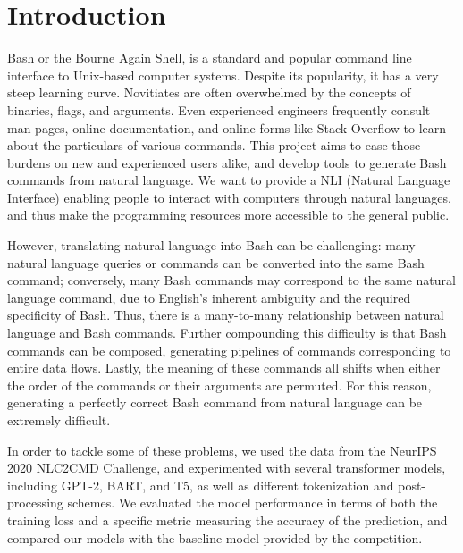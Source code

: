 \section{Introduction}
Bash or the Bourne Again Shell, is a standard and popular command line
interface to Unix-based computer systems. Despite its popularity, it has a
very steep learning curve. Novitiates are often overwhelmed by the concepts of
binaries, flags, and arguments. Even experienced engineers frequently consult
man-pages, online documentation, and online forms like Stack Overflow to learn
about the particulars of various commands. This project aims to ease those
burdens on new and experienced users alike, and develop tools to generate Bash
commands from natural language. We want to provide a NLI (Natural Language
Interface) enabling people to interact with computers through natural
languages, and thus make the programming resources more accessible to the
general public.
\par
However, translating natural language into Bash can be challenging: many
natural language queries or commands can be converted into the same Bash
command; conversely, many Bash commands may correspond to the same natural
language command, due to English's inherent ambiguity and the required specificity
of Bash. Thus, there is a many-to-many relationship between natural
language and Bash commands. Further compounding this difficulty is that Bash
commands can be composed, generating pipelines of commands corresponding to
entire data flows. Lastly, the meaning of these commands all shifts when
either the order of the commands or their arguments are permuted. For this
reason, generating a perfectly correct Bash command from natural language can
be extremely difficult.
\par
In order to tackle some of these problems, we used the data from the NeurIPS
2020 NLC2CMD Challenge, and experimented with several transformer models,
including GPT-2, BART, and T5, as well as different tokenization and
post-processing schemes. We evaluated the model performance in terms of both
the training loss and a specific metric measuring the accuracy of the
prediction, and compared our models with the baseline model provided by the
competition.


